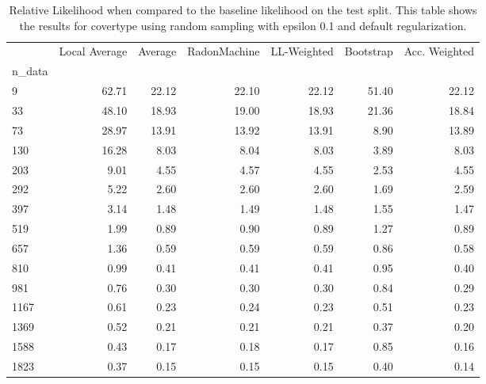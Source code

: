 \begin{table}
\centering
\caption{Relative Likelihood when compared to the baseline likelihood on the test split. This table shows the results for  covertype using  random sampling with epsilon  0.1 and  default regularization.}
\label{tab:9}
\begin{tabular}{lrrrrrr}
\toprule
{} &  Local Average &  Average &  RadonMachine &  LL-Weighted &  Bootstrap &  Acc. Weighted \\
n\_data &                &          &               &              &            &                \\
\midrule
9      &          62.71 &    22.12 &         22.10 &        22.12 &      51.40 &          22.12 \\
33     &          48.10 &    18.93 &         19.00 &        18.93 &      21.36 &          18.84 \\
73     &          28.97 &    13.91 &         13.92 &        13.91 &       8.90 &          13.89 \\
130    &          16.28 &     8.03 &          8.04 &         8.03 &       3.89 &           8.03 \\
203    &           9.01 &     4.55 &          4.57 &         4.55 &       2.53 &           4.55 \\
292    &           5.22 &     2.60 &          2.60 &         2.60 &       1.69 &           2.59 \\
397    &           3.14 &     1.48 &          1.49 &         1.48 &       1.55 &           1.47 \\
519    &           1.99 &     0.89 &          0.90 &         0.89 &       1.27 &           0.89 \\
657    &           1.36 &     0.59 &          0.59 &         0.59 &       0.86 &           0.58 \\
810    &           0.99 &     0.41 &          0.41 &         0.41 &       0.95 &           0.40 \\
981    &           0.76 &     0.30 &          0.30 &         0.30 &       0.84 &           0.29 \\
1167   &           0.61 &     0.23 &          0.24 &         0.23 &       0.51 &           0.23 \\
1369   &           0.52 &     0.21 &          0.21 &         0.21 &       0.37 &           0.20 \\
1588   &           0.43 &     0.17 &          0.18 &         0.17 &       0.85 &           0.16 \\
1823   &           0.37 &     0.15 &          0.15 &         0.15 &       0.40 &           0.14 \\
\bottomrule
\end{tabular}
\end{table}
